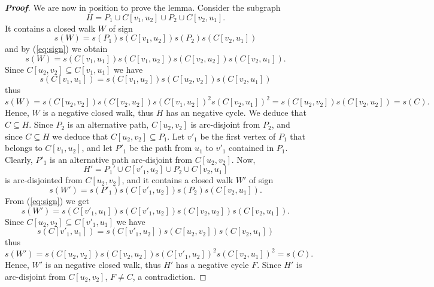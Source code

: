 \documentclass[11pt,a4paper]{article}
\begin{document}
\begin{proof}[{\bf Proof}]
\medskip
We are now in position to prove the lemma. Consider the subgraph
\[
H=P_1\cup C[v_1,u_2]\cup P_2\cup C[v_2,u_1]. 
\]
It contains a closed walk $W$ of sign 
\[
s(W) =s(P_1)s(C[v_1,u_2])s(P_2)s(C[v_2,u_1])
\]
and by (\ref{eq:sign}) we obtain
\[
s(W)=s(C[v_1,u_1])s(C[v_1,u_2])s(C[v_2,u_2])s(C[v_2,u_1]).
\]
Since $C[u_2,v_2]\subseteq C[v_1,u_1]$ we have 
\[
s(C[v_1,u_1])=s(C[v_1,u_2])s(C[u_2,v_2])s(C[v_2,u_1])
\]
thus
\[
s(W) =s(C[u_2,v_2])s(C[v_2,u_2])s(C[v_1,u_2])^2s(C[v_2,u_1])^2
=s(C[u_2,v_2])s(C[v_2,u_2])=s(C).
\]
Hence, $W$ is a negative closed walk, thus $H$ has an negative cycle. We deduce that $C\subseteq H$. Since $P_2$ is an alternative path, $C[u_2,v_2]$ is arc-disjoint from $P_2$, and since $C\subseteq H$ we deduce that $C[u_2,v_2]\subseteq P_1$. Let $v'_1$ be the first vertex of $P_1$ that belongs to $C[v_1,u_2]$, and let $P'_1$ be the path from $u_1$ to $v'_1$ contained in $P_1$. Clearly, $P'_1$ is an alternative path arc-disjoint from $C[u_2,v_2]$. Now, 
\[
H'= P_1'\cup C[v'_1,u_2]\cup P_2\cup C[v_2,u_1]
\]
is arc-disjointed from $C[u_2,v_2]$, and it contains a closed walk $W'$ of sign 
\[
s(W') =s(P'_1)s(C[v'_1,u_2])s(P_2)s(C[v_2,u_1]).
\]
From (\ref{eq:sign}) we get 
\[
s(W') =s(C[v'_1,u_1])s(C[v'_1,u_2])s(C[v_2,u_2])s(C[v_2,u_1]).
\]
Since $C[u_2,v_2]\subseteq C[v'_1,u_1]$ we have 
\[
s(C[v'_1,u_1])=s(C[v'_1,u_2])s(C[u_2,v_2])s(C[v_2,u_1])
\]
thus
\[
s(W') =s(C[u_2,v_2])s(C[v_2,u_2])s(C[v'_1,u_2])^2s(C[v_2,u_1])^2=s(C).
\]
Hence, $W'$ is an negative closed walk, thus $H'$ has a negative cycle $F$. Since $H'$ is arc-disjoint from $C[u_2,v_2]$, $F\neq C$, a contradiction.
\end{proof}
\end{document}
